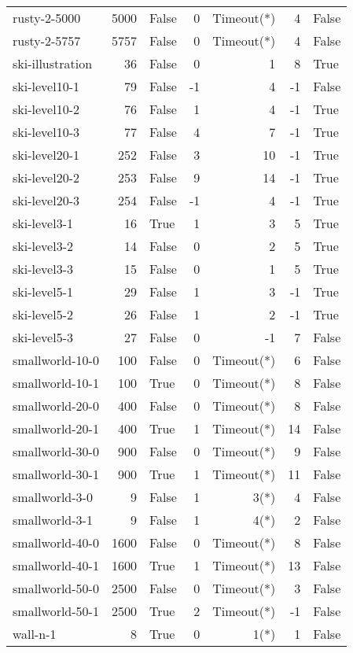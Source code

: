 \begin{longtable}{lrlrrrl}
rusty-2-5000 & 5000 & False & 0 & Timeout(*) & 4 & False \\
rusty-2-5757 & 5757 & False & 0 & Timeout(*) & 4 & False \\
ski-illustration & 36 & False & 0 & 1 & 8 & True \\
ski-level10-1 & 79 & False & -1 & 4 & -1 & False \\
ski-level10-2 & 76 & False & 1 & 4 & -1 & True \\
ski-level10-3 & 77 & False & 4 & 7 & -1 & True \\
ski-level20-1 & 252 & False & 3 & 10 & -1 & True \\
ski-level20-2 & 253 & False & 9 & 14 & -1 & True \\
ski-level20-3 & 254 & False & -1 & 4 & -1 & True \\
ski-level3-1 & 16 & True & 1 & 3 & 5 & True \\
ski-level3-2 & 14 & False & 0 & 2 & 5 & True \\
ski-level3-3 & 15 & False & 0 & 1 & 5 & True \\
ski-level5-1 & 29 & False & 1 & 3 & -1 & True \\
ski-level5-2 & 26 & False & 1 & 2 & -1 & True \\
ski-level5-3 & 27 & False & 0 & -1 & 7 & False \\
smallworld-10-0 & 100 & False & 0 & Timeout(*) & 6 & False \\
smallworld-10-1 & 100 & True & 0 & Timeout(*) & 8 & False \\
smallworld-20-0 & 400 & False & 0 & Timeout(*) & 8 & False \\
smallworld-20-1 & 400 & True & 1 & Timeout(*) & 14 & False \\
smallworld-30-0 & 900 & False & 0 & Timeout(*) & 9 & False \\
smallworld-30-1 & 900 & True & 1 & Timeout(*) & 11 & False \\
smallworld-3-0 & 9 & False & 1 & 3(*) & 4 & False \\
smallworld-3-1 & 9 & False & 1 & 4(*) & 2 & False \\
smallworld-40-0 & 1600 & False & 0 & Timeout(*) & 8 & False \\
smallworld-40-1 & 1600 & True & 1 & Timeout(*) & 13 & False \\
smallworld-50-0 & 2500 & False & 0 & Timeout(*) & 3 & False \\
smallworld-50-1 & 2500 & True & 2 & Timeout(*) & -1 & False \\
wall-n-1 & 8 & True & 0 & 1(*) & 1 & False \\

\end{longtable}
